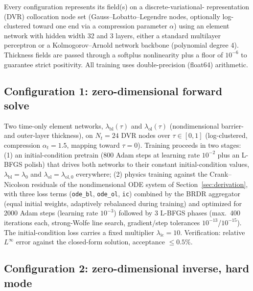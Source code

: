 Every configuration represents its field(s) on a discrete-variational-%
representation (DVR) collocation node set (Gauss--Lobatto--Legendre
nodes, optionally log-clustered toward one end via a compression
parameter $\alpha$) using an element network with hidden width 32 and 3
layers, either a standard multilayer perceptron or a Kolmogorov--Arnold
network backbone (polynomial degree 4). Thickness fields are passed
through a softplus nonlinearity plus a floor of $10^{-6}$ to guarantee
strict positivity. All training uses double-precision (float64)
arithmetic.

\subsection{Configuration 1: zero-dimensional forward solve}
\label{sec:config-forward}

Two time-only element networks, $\lambda_\mathrm{bl}(\tau)$ and
$\lambda_\mathrm{ol}(\tau)$ (nondimensional barrier- and outer-layer
thickness), on $N_t = 24$ DVR nodes over $\tau \in [0, 1]$
(log-clustered, compression $\alpha_t = 1.5$, mapping toward $\tau=0$).
Training proceeds in two stages: (1) an initial-condition pretrain
(800 Adam steps at learning rate $10^{-2}$ plus an L-BFGS polish) that
drives both networks to their constant initial-condition values,
$\lambda_\mathrm{bl} = \lambda_0$ and $\lambda_\mathrm{ol} = \lambda_{\mathrm{ol},0}$
everywhere; (2) physics training against the Crank--Nicolson residuals
of the nondimensional ODE system of Section~\ref{sec:derivation}, with
three loss terms (\texttt{ode\_bl}, \texttt{ode\_ol}, \texttt{ic})
combined by the BRDR aggregator (equal initial weights, adaptively
rebalanced during training) and optimized for 2000 Adam steps
(learning rate $10^{-3}$) followed by 3 L-BFGS phases (max.\ 400
iterations each, strong-Wolfe line search, gradient/step tolerances
$10^{-13}$/$10^{-15}$). The initial-condition loss carries a fixed
multiplier $\lambda_\text{ic} = 10$. Verification: relative
$L^\infty$ error against the closed-form solution, acceptance
$\le 0.5\%$.

\subsection{Configuration 2: zero-dimensional inverse, hard mode}
\label{sec:config-hard}

